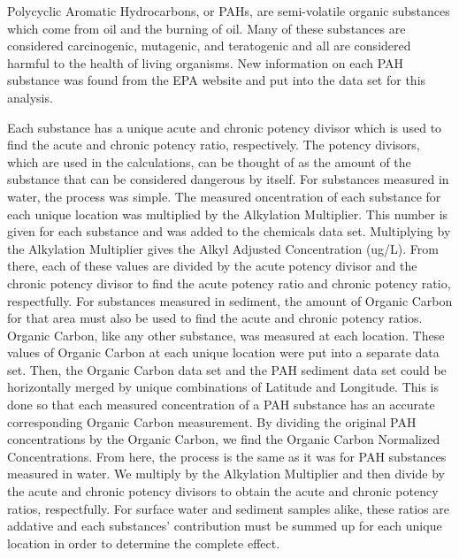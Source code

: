 \documentclass[11pt]{article}
\begin{document}
Polycyclic Aromatic Hydrocarbons, or PAHs, are semi-volatile organic substances which come from oil and the burning of oil.  Many of these substances are considered carcinogenic, mutagenic, and teratogenic and all are considered harmful to the health of living organisms.  New information on each PAH substance was found from the EPA website and put into the data set for this analysis.  

Each substance has a unique acute and chronic potency divisor which is used to find the acute and chronic potency ratio, respectively.  The potency divisors, which are used in the calculations, can be thought of as the amount of the substance that can be considered dangerous by itself. For substances measured in water, the process was simple.  The measured oncentration of each substance for each unique location was multiplied by the Alkylation Multiplier.  This number is given for each substance and was added to the chemicals data set.  Multiplying by the Alkylation Multiplier gives the Alkyl Adjusted Concentration (ug/L).  From there, each of these values are divided by the acute potency divisor and the chronic potency divisor to find the acute potency ratio and chronic potency ratio, respectfully.  For substances measured in sediment, the amount of Organic Carbon for that area must also be used to find the acute and chronic potency ratios. Organic Carbon, like any other substance, was measured at each location.  These values of Organic Carbon at each unique location were put into a separate data set.  Then, the Organic Carbon data set and the PAH sediment data set could be horizontally merged by unique combinations of Latitude and Longitude.  This is done so that each measured concentration of a PAH substance has an accurate corresponding Organic Carbon measurement.  By dividing the original PAH concentrations by the Organic Carbon, we find the Organic Carbon Normalized Concentrations.  From here, the process is the same as it was for PAH substances measured in water.  We multiply by the Alkylation Multiplier and then divide by the acute and chronic potency divisors to obtain the acute and chronic potency ratios, respectfully.   For surface water and sediment samples alike, these ratios are addative and each substances' contribution must be summed up for each unique location in order to determine the complete effect. 
\end{document}
